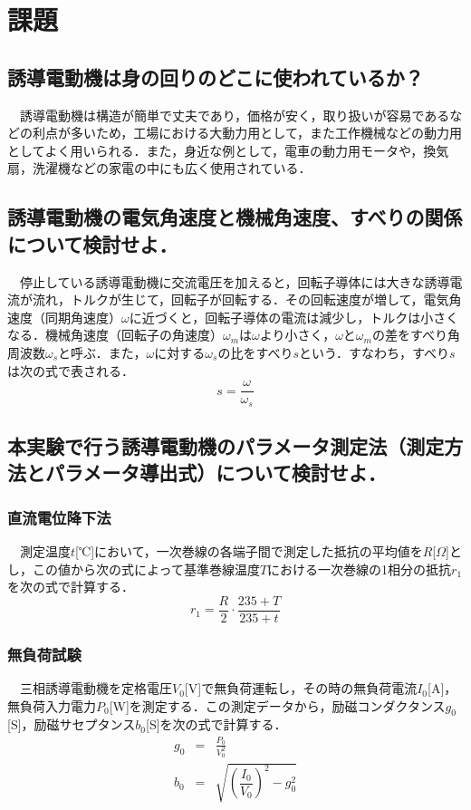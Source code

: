 



\fontsize{11.041pt}{16.562pt}\selectfont

\section{課題}
\subsection{誘導電動機は身の回りのどこに使われているか？}
　誘導電動機は構造が簡単で丈夫であり，価格が安く，取り扱いが容易であるなどの利点が多いため，工場における大動力用として，また工作機械などの動力用としてよく用いられる．また，身近な例として，電車の動力用モータや，換気扇，洗濯機などの家電の中にも広く使用されている．

\subsection{誘導電動機の電気角速度と機械角速度、すべりの関係について検討せよ．}
　停止している誘導電動機に交流電圧を加えると，回転子導体には大きな誘導電流が流れ，トルクが生じて，回転子が回転する．その回転速度が増して，電気角速度（同期角速度）$\omega$に近づくと，回転子導体の電流は減少し，トルクは小さくなる．機械角速度（回転子の角速度）$\omega_m$は$\omega$より小さく，$\omega$と$\omega_m$の差をすべり角周波数$\omega_s$と呼ぶ．また，$\omega$に対する$\omega_s$の比をすべり$s$という．すなわち，すべり$s$は次の式で表される．
\begin{equation}
    s = \frac{\omega}{\omega_s}
\end{equation}

\subsection{本実験で行う誘導電動機のパラメータ測定法（測定方法とパラメータ導出式）について検討せよ．}
\subsubsection{直流電位降下法}
　測定温度$t$[℃]において，一次巻線の各端子間で測定した抵抗の平均値を$R$[$\Omega$]とし，この値から次の式によって基準巻線温度$T$における一次巻線の1相分の抵抗$r_1$を次の式で計算する．
\begin{equation}
    r_1 = \frac{R}{2} \cdot \frac{235 + T}{235 + t}
\end{equation}

\subsubsection{無負荷試験}
　三相誘導電動機を定格電圧$V_0$[V]で無負荷運転し，その時の無負荷電流$I_0$[A]，無負荷入力電力$P_0$[W]を測定する．この測定データから，励磁コンダクタンス$g_0$[S]，励磁サセプタンス$b_0$[S]を次の式で計算する．
\begin{eqnarray}
    g_0 &=& \frac{P_0}{V_0^2}\\
    b_0 &=& \sqrt{\left(\dfrac{I_0}{V_0}\right)^2-g_0^2}
\end{eqnarray}

